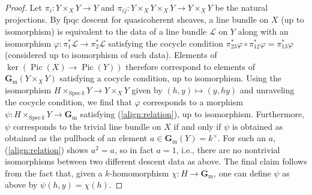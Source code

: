 \documentclass[11pt,reqno]{amsart}
\theoremstyle{definition}
\renewcommand{\rm}{\mathrm}
\newcommand{\Spec}{\mathrm{Spec} \,}
\newcommand{\vp}{\varphi}
\newcommand{\bG}{{\mathbf G}}
\newcommand{\sL}{{\mathscr L}}
\newcommand{\bGm}{\bG_{\rm{m}}}
\DeclareMathOperator{\Pic}{Pic}
\begin{document}
\begin{proof}
	Let $\pi_i: Y \times_X Y \to Y$ and $\pi_{ij}: Y \times_X Y \times_X Y \to Y \times_X Y$ be the natural projections. By fpqc descent for quasicoherent sheaves, a line bundle on $X$ (up to isomorphism) is equivalent to the data of a line bundle $\sL$ on $Y$ along with an isomorphism $\vp: \pi_1^*\sL \to \pi_2^*\sL$ satisfying the cocycle condition $\pi_{23}^*\vp \circ \pi_{12}^*\vp = \pi_{13}^*\vp$ (considered up to isomorphism of such data). Elements of $\ker(\Pic(X) \to \Pic(Y))$ therefore correspond to elements of $\bGm(Y \times_X Y)$ satisfying a cocycle condition, up to isomorphism. Using the isomorphism $H \times_{\Spec k} Y \to Y \times_X Y$ given by $(h, y) \mapsto (y, hy)$ and unraveling the cocycle condition, we find that $\vp$ corresponds to a morphism $\psi: H \times_{\Spec k} Y \to \bGm$ satisfying (\ref{align:relation}), up to isomorphism. Furthermore, $\psi$ corresponds to the trivial line bundle on $X$ if and only if $\psi$ is obtained as obtained as the pullback of an element $a \in \bGm(Y) = k^\times$. For such an $a$, (\ref{align:relation}) shows $a^2 = a$, so in fact $a = 1$, i.e., there are no nontrivial isomorphisms between two different descent data as above. The final claim follows from the fact that, given a $k$-homomorphism $\chi\colon H \to \bGm$, one can define $\psi$ as above by $\psi(h, y) = \chi(h)$.
\end{proof}
\end{document}
